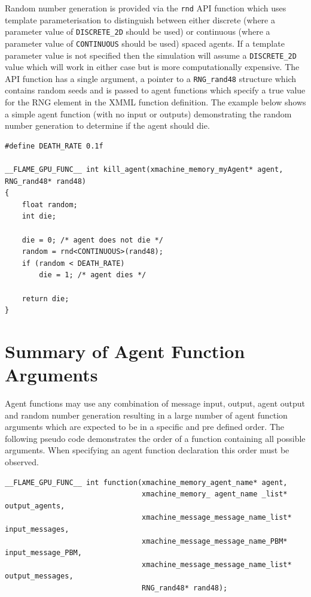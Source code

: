\documentclass[11pt, a4paper, onecolumn, oneside]{report}
\begin{document}
Random number generation is provided via the \texttt{rnd} API function which uses template parameterisation to distinguish between either discrete (where a parameter value of \texttt{DISCRETE_2D} should be used) or continuous (where a parameter value of \texttt{CONTINUOUS} should be used) spaced agents.
If a template parameter value is not specified then the simulation will assume a \texttt{DISCRETE_2D} value which will work in either case but is more computationally expensive.
The API function has a single argument, a pointer to a \texttt{RNG_rand48} structure which contains random seeds and is passed to agent functions which specify a true value for the RNG element in the XMML function definition.
The example below shows a simple agent function (with no input or outputs) demonstrating the random number generation to determine if the agent should die.

\begin{verbatim}
#define DEATH_RATE 0.1f

__FLAME_GPU_FUNC__ int kill_agent(xmachine_memory_myAgent* agent, RNG_rand48* rand48)
{
    float random;
    int die;

    die = 0; /* agent does not die */
    random = rnd<CONTINUOUS>(rand48);
    if (random < DEATH_RATE)
        die = 1; /* agent dies */
    
    return die;
}
\end{verbatim}

\section{Summary of Agent Function Arguments}
\label{sec:38}


Agent functions may use any combination of message input, output, agent output and random number generation resulting in a large number of agent function arguments which are expected to be in a specific and pre defined order.
The following pseudo code demonstrates the order of a function containing all possible arguments.
When specifying an agent function declaration this order must be observed.

\begin{verbatim}
__FLAME_GPU_FUNC__ int function(xmachine_memory_agent_name* agent,
                                xmachine_memory_ agent_name _list* output_agents,
                                xmachine_message_message_name_list* input_messages,
                                xmachine_message_message_name_PBM* input_message_PBM,
                                xmachine_message_message_name_list* output_messages,
                                RNG_rand48* rand48);
\end{verbatim}
\end{document}
